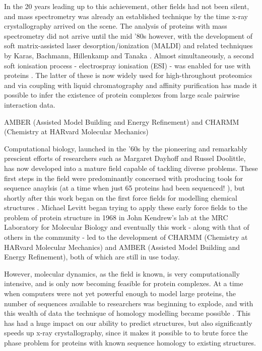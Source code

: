 \documentclass[a4paper,11pt,twoside,openright]{scrbook}
\begin{document}
In the 20 years leading up to this achievement, other fields had not been silent, and mass spectrometry was already an established technique by the time x-ray crystallography arrived on the scene. The analysis of proteins with mass spectrometry did not arrive until the mid '80s however, with the development of soft matrix-assisted laser desorption/ionization (MALDI) and related techniques by Karas, Bachmann, Hillenkamp and Tanaka \cite{Karas1985,Tanaka1988}. Almost simultaneously, a second soft ionisation process - electrospray ionisation (ESI) - was enabled for use with proteins \cite{Fenn1989}. The latter of these is now widely used for high-throughout proteomics and via coupling with liquid chromatography and affinity purification has made it possible to infer the existence of protein complexes from large scale pairwise interaction data.

AMBER \cite{Salomon-Ferrer2013,Amber2017} (Assisted Model Building and Energy Refinement) and CHARMM \cite{Brooks2009} (Chemistry at HARvard Molecular Mechanics)

Computational biology, launched in the '60s by the pioneering and remarkably prescient efforts of researchers such as Margaret Dayhoff and Russel Doolittle, has now developed into a mature field capable of tackling diverse problems. These first steps in the field were predominantly concerned with producing tools for sequence anaylsis (at a time when just 65 proteins had been sequenced! \cite{Dayhoff1965}), but shortly after this work began on the first force fields for modelling chemical structures \cite{Bixon1967}. Michael Levitt began trying to apply these early force fields to the problem of protein structure in 1968 in John Kendrew's lab at the MRC Laboratory for Molecular Biology \cite{Levitt2001} and eventually this work - along with that of others in the community - led to the development of CHARMM \cite{Brooks2009} (Chemistry at HARvard Molecular Mechanics) and AMBER \cite{Salomon-Ferrer2013,Amber2017} (Assisted Model Building and Energy Refinement), both of which are still in use today.

However, molecular dynamics, as the field is known, is very computationally intensive, and is only now becoming feasible for protein complexes. At a time when computers were not yet powerful enough to model large proteins, the number of sequences available to researchers was beginning to explode, and with this wealth of data the technique of homology modelling became possible \cite{Rost1996,Xu1998}. This has had a huge impact on our ability to predict structures, but also significantly speeds up x-ray crystallography, since it makes it possible to to brute force the phase problem for proteins with known sequence homology to existing structures.
\end{document}
